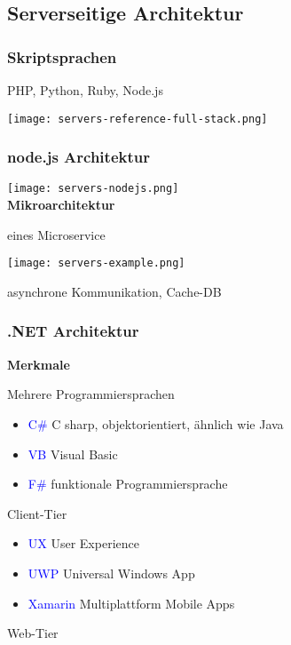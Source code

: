 \subsection{Serverseitige Architektur}

\subsubsection{Skriptsprachen}

PHP, Python, Ruby, Node.js

\texttt{[image: servers-reference-full-stack.png]} \\

\subsubsection{node.js Architektur}

\texttt{[image: servers-nodejs.png]} \\

\textbf{Mikroarchitektur}

eines Microservice

\texttt{[image: servers-example.png]}

asynchrone Kommunikation, Cache-DB

\subsubsection{.NET Architektur}

\textbf{Merkmale}

Mehrere Programmiersprachen

\begin{itemize}
    \item \textcolor{blue}{C\#} C sharp, objektorientiert, ähnlich wie Java
    \item \textcolor{blue}{VB} Visual Basic
    \item \textcolor{blue}{F\#} funktionale Programmiersprache
\end{itemize}
\vspace{10pt}
Client-Tier

\begin{itemize}
    \item \textcolor{blue}{UX} User Experience
    \item \textcolor{blue}{UWP} Universal Windows App
    \item \textcolor{blue}{Xamarin} Multiplattform Mobile Apps
\end{itemize}
\vspace{10pt}
Web-Tier

